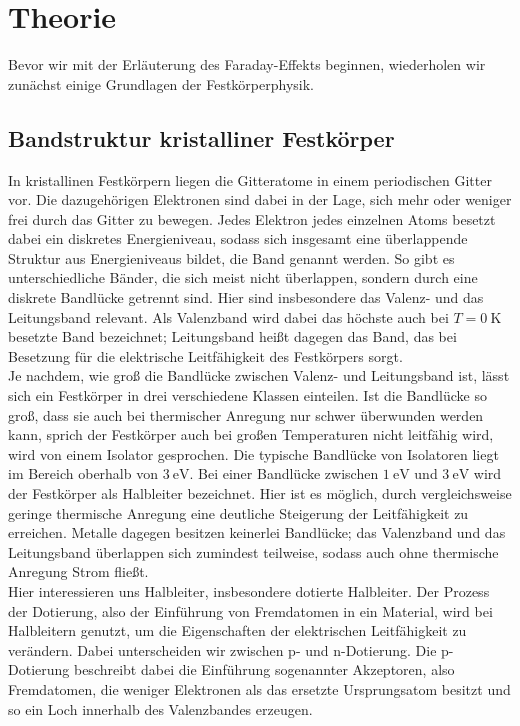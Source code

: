 \section{Theorie}
\label{sec:theorie}

Bevor wir mit der Erläuterung des Faraday-Effekts beginnen, wiederholen wir zunächst einige Grundlagen der Festkörperphysik.

\subsection{Bandstruktur kristalliner Festkörper}

In kristallinen Festkörpern liegen die Gitteratome in einem periodischen Gitter vor.
Die dazugehörigen Elektronen sind dabei in der Lage, sich mehr oder weniger frei durch das Gitter zu bewegen.
Jedes Elektron jedes einzelnen Atoms besetzt dabei ein diskretes Energieniveau, sodass sich insgesamt eine überlappende Struktur
aus Energieniveaus bildet, die Band genannt werden.
So gibt es unterschiedliche Bänder, die sich meist nicht überlappen, sondern durch eine diskrete Bandlücke getrennt sind.
Hier sind insbesondere das Valenz- und das Leitungsband relevant.
Als Valenzband wird dabei das höchste auch bei $T=\SI{0}{\kelvin}$ besetzte Band bezeichnet; Leitungsband heißt dagegen das Band,
das bei Besetzung für die elektrische Leitfähigkeit des Festkörpers sorgt. \\

Je nachdem, wie groß die Bandlücke zwischen Valenz- und Leitungsband ist, lässt sich ein Festkörper in drei verschiedene Klassen einteilen.
Ist die Bandlücke so groß, dass sie auch bei thermischer Anregung nur schwer überwunden werden kann, sprich der Festkörper auch bei großen
Temperaturen nicht leitfähig wird, wird von einem Isolator gesprochen.
Die typische Bandlücke von Isolatoren liegt im Bereich oberhalb von $\SI{3}{\eV}$.
Bei einer Bandlücke zwischen $\SI{1}{\eV}$ und $\SI{3}{\eV}$ wird der Festkörper als Halbleiter bezeichnet.
Hier ist es möglich, durch vergleichsweise geringe thermische Anregung eine deutliche Steigerung der Leitfähigkeit zu erreichen.
Metalle dagegen besitzen keinerlei Bandlücke; das Valenzband und das Leitungsband überlappen sich zumindest teilweise, sodass auch ohne
thermische Anregung Strom fließt. \\

Hier interessieren uns Halbleiter, insbesondere dotierte Halbleiter.
Der Prozess der Dotierung, also der Einführung von Fremdatomen in ein Material, wird bei Halbleitern genutzt, um die Eigenschaften der
elektrischen Leitfähigkeit zu verändern.
Dabei unterscheiden wir zwischen p- und n-Dotierung.
Die p-Dotierung beschreibt dabei die Einführung sogenannter Akzeptoren, also Fremdatomen,
die weniger Elektronen als das ersetzte Ursprungsatom besitzt und so ein Loch innerhalb des Valenzbandes erzeugen.

